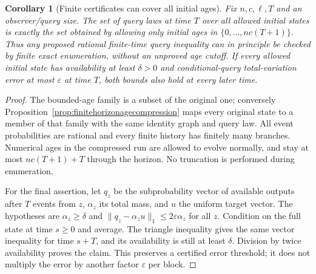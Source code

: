 \documentclass[11pt]{article}
\newtheorem{corollary}[theorem]{Corollary}
\begin{document}
\begin{corollary}[Finite certificates can cover all initial ages]
\label{cor:finitehorizoncertification}
Fix $n,c,\ell,T$ and an observer/query size. The set of query
laws at time $T$ over all allowed initial states is exactly
the set obtained by allowing only initial ages in
$\{0,\ldots,nc(T+1)\}$. Thus any proposed rational finite-time
query inequality can in principle be checked by finite exact
enumeration, without an unproved age cutoff. If every allowed
initial state has availability at least $\delta>0$ and
conditional-query total-variation error at most $\varepsilon$
at time $T$, both bounds also hold at every later time.
\end{corollary}
\begin{proof}
The bounded-age family is a subset of the original one;
conversely Proposition~\ref{prop:finitehorizonagecompression}
maps every original state to a member of that family with
the same identity graph and query law. All event probabilities
are rational and every finite history has finitely many
branches. Numerical ages in the compressed run are allowed
to evolve normally, and stay at most $nc(T+1)+T$ through the
horizon. No truncation is performed during enumeration.

For the final assertion, let $q_z$ be the subprobability
vector of available outputs after $T$ events from $z$,
$\alpha_z$ its total mass, and $u$ the uniform target vector.
The hypotheses are $\alpha_z\ge\delta$ and
$\|q_z-\alpha_z u\|_1\le2\varepsilon\alpha_z$ for all $z$.
Condition on the full state at time $s\ge0$ and average.
The triangle inequality gives the same vector inequality
for time $s+T$, and its availability is still at least
$\delta$. Division by twice availability proves the claim.
This preserves a certified error threshold; it does not
multiply the error by another factor $\varepsilon$ per block.
\end{proof}
\end{document}
